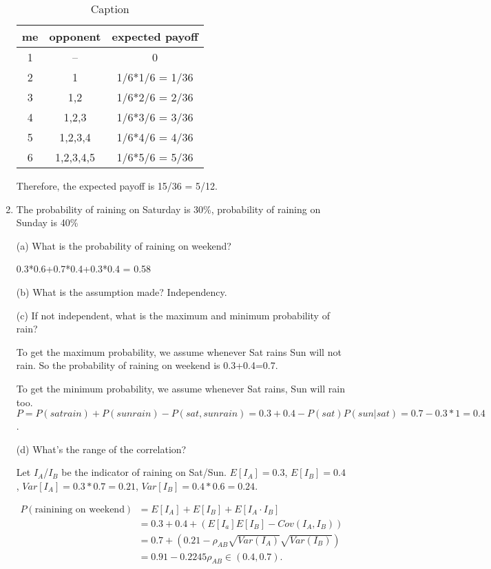 \documentclass{article}
\begin{document}
\begin{enumerate}
    \begin{table}[h!]
        \centering
        \begin{tabular}{c|c|c}
             \hline 
             me &  opponent & expected payoff\\
             \hline 
             1 & -- & 0\\
             \hline 
             2 & 1 & 1/6*1/6 = 1/36 \\
             \hline 
             3 & {1,2} & 1/6*2/6 = 2/36 \\
             \hline 
             4 & {1,2,3} & 1/6*3/6 = 3/36 \\
             \hline 
             5 & {1,2,3,4} & 1/6*4/6 = 4/36 \\
             \hline 
             6 & {1,2,3,4,5} & 1/6*5/6 = 5/36 \\
             \hline 
        \end{tabular}
        \caption{Caption}
        \label{tab:my_label}
    \end{table}
    Therefore, the expected payoff is 15/36 = 5/12.

    \item The probability of raining on Saturday is 30\%, probability of raining on Sunday is 40\%
 
 (a) What is the probability of raining on weekend?

 0.3*0.6+0.7*0.4+0.3*0.4 = 0.58
 
 (b) What is the assumption made? Independency.
 
 (c) If not independent, what is the maximum and minimum probability of rain? 

 To get the maximum probability, we assume whenever Sat rains Sun will not rain. So the probability of raining on weekend is 0.3+0.4=0.7. 

 To get the minimum probability, we assume whenever Sat rains, Sun will rain too. $P=P(sat rain)+P(sun rain) - P(sat, sun rain) = 0.3+0.4-P(sat)P(sun|sat)=0.7-0.3*1=0.4$.

 (d) What's the range of the correlation?

 Let $I_A$/$I_B$ be the indicator of raining on Sat/Sun. $E[I_A]=0.3$, $E[I_B] = 0.4$, $Var[I_A]=0.3*0.7=0.21$, $Var[I_B]=0.4*0.6=0.24$.

 \begin{align*}
     P(\text{rainining on weekend}) &= E[I_A] + E[I_B] + E[I_A\cdot I_B] \\
     &= 0.3+0.4 + (E[I_a] E[I_B] - Cov(I_A, I_B)) \\
     &= 0.7 + \left(0.21-\rho_{AB}\sqrt{Var(I_A)}\sqrt{Var(I_B)}\right) \\
     &= 0.91-0.2245\rho_{AB} \in (0.4,0.7).
 \end{align*}


\end{enumerate}
\end{document}
